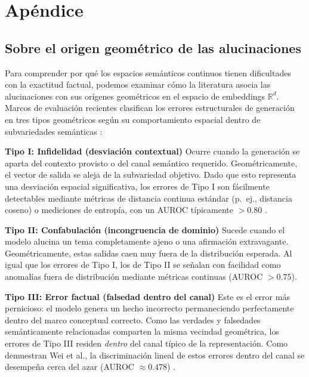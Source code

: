 \documentclass{article}
\begin{document}



\hypertarget{apuxe9ndice}{%
\section{Apéndice}\label{apuxe9ndice}}

\hypertarget{sobre-el-origen-geomuxe9trico-de-las-alucinaciones}{%
\subsection{\texorpdfstring{Sobre el origen geométrico de las
alucinaciones
\label{app:hallucinations}}{Sobre el origen geométrico de las alucinaciones }}\label{sobre-el-origen-geomuxe9trico-de-las-alucinaciones}}

Para comprender por qué los espacios semánticos continuos tienen
dificultades con la exactitud factual, podemos examinar cómo la
literatura asocia las alucinaciones con sus orígenes geométricos en el
espacio de embeddings \(\mathbb{R}^d\). Marcos de evaluación recientes
clasifican los errores estructurales de generación en tres tipos
geométricos según su comportamiento espacial dentro de subvariedades
semánticas \citep{wei2024measuring, sansford2024grapheval}:

\textbf{Tipo I: Infidelidad (desviación contextual)} Ocurre cuando la
generación se aparta del contexto provisto o del canal semántico
requerido. Geométricamente, el vector de salida se aleja de la
subvariedad objetivo. Dado que esto representa una desviación espacial
significativa, los errores de Tipo I son fácilmente detectables mediante
métricas de distancia continua estándar (p.~ej., distancia coseno) o
mediciones de entropía, con un AUROC típicamente \(> 0.80\)
\citep{wei2024measuring}.

\textbf{Tipo II: Confabulación (incongruencia de dominio)} Sucede cuando
el modelo alucina un tema completamente ajeno o una afirmación
extravagante. Geométricamente, estas salidas caen muy fuera de la
distribución esperada. Al igual que los errores de Tipo I, los de Tipo
II se señalan con facilidad como anomalías fuera de distribución
mediante métricas continuas (AUROC \(> 0.75\)).

\textbf{Tipo III: Error factual (falsedad dentro del canal)} Este es el
error más pernicioso: el modelo genera un hecho incorrecto permaneciendo
perfectamente dentro del marco conceptual correcto. Como las verdades y
falsedades semánticamente relacionadas comparten la misma vecindad
geométrica, los errores de Tipo III residen \emph{dentro} del canal
típico de la representación. Como demuestran Wei et al., la
discriminación lineal de estos errores dentro del canal se desempeña
cerca del azar (AUROC \(\approx 0.478\)) \citep{wei2024measuring}.
\end{document}
